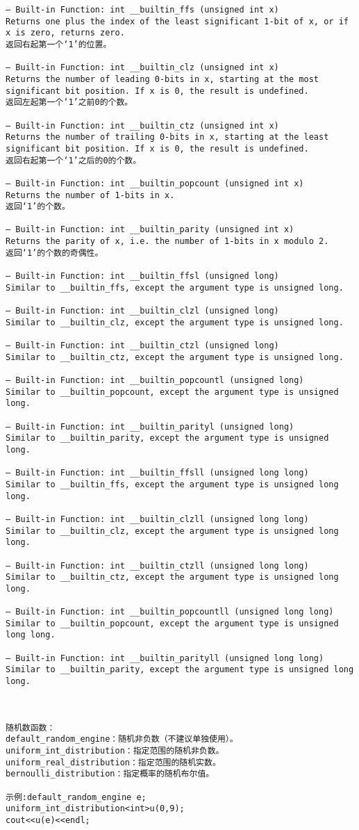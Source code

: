 \begin{lstlisting}
— Built-in Function: int __builtin_ffs (unsigned int x)
Returns one plus the index of the least significant 1-bit of x, or if x is zero, returns zero.
返回右起第一个‘1’的位置。

— Built-in Function: int __builtin_clz (unsigned int x)
Returns the number of leading 0-bits in x, starting at the most significant bit position. If x is 0, the result is undefined.
返回左起第一个‘1’之前0的个数。

— Built-in Function: int __builtin_ctz (unsigned int x)
Returns the number of trailing 0-bits in x, starting at the least significant bit position. If x is 0, the result is undefined.
返回右起第一个‘1’之后的0的个数。

— Built-in Function: int __builtin_popcount (unsigned int x)
Returns the number of 1-bits in x.
返回‘1’的个数。

— Built-in Function: int __builtin_parity (unsigned int x)
Returns the parity of x, i.e. the number of 1-bits in x modulo 2.
返回‘1’的个数的奇偶性。

— Built-in Function: int __builtin_ffsl (unsigned long)
Similar to __builtin_ffs, except the argument type is unsigned long. 

— Built-in Function: int __builtin_clzl (unsigned long)
Similar to __builtin_clz, except the argument type is unsigned long. 

— Built-in Function: int __builtin_ctzl (unsigned long)
Similar to __builtin_ctz, except the argument type is unsigned long. 

— Built-in Function: int __builtin_popcountl (unsigned long)
Similar to __builtin_popcount, except the argument type is unsigned long. 

— Built-in Function: int __builtin_parityl (unsigned long)
Similar to __builtin_parity, except the argument type is unsigned long. 

— Built-in Function: int __builtin_ffsll (unsigned long long)
Similar to __builtin_ffs, except the argument type is unsigned long long. 

— Built-in Function: int __builtin_clzll (unsigned long long)
Similar to __builtin_clz, except the argument type is unsigned long long. 

— Built-in Function: int __builtin_ctzll (unsigned long long)
Similar to __builtin_ctz, except the argument type is unsigned long long. 

— Built-in Function: int __builtin_popcountll (unsigned long long)
Similar to __builtin_popcount, except the argument type is unsigned long long. 

— Built-in Function: int __builtin_parityll (unsigned long long)
Similar to __builtin_parity, except the argument type is unsigned long long.



随机数函数：
default_random_engine：随机非负数（不建议单独使用）。
uniform_int_distribution：指定范围的随机非负数。
uniform_real_distribution：指定范围的随机实数。
bernoulli_distribution：指定概率的随机布尔值。

示例:default_random_engine e;
uniform_int_distribution<int>u(0,9);
cout<<u(e)<<endl;
\end{lstlisting}